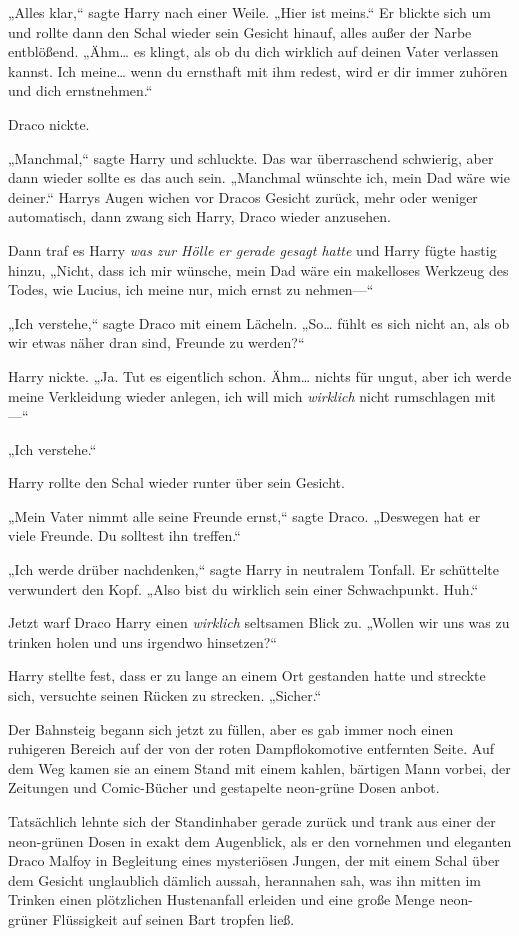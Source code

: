 {„Alles klar,“ sagte Harry nach einer Weile. „Hier ist meins.“ Er blickte sich um und rollte dann den Schal wieder sein Gesicht hinauf, alles außer der Narbe entblößend. „Ähm… es klingt, als ob du dich wirklich auf deinen Vater verlassen kannst. Ich meine… wenn du ernsthaft mit ihm redest, wird er dir immer zuhören und dich ernstnehmen.“

Draco nickte.

„Manchmal,“ sagte Harry und schluckte. Das war überraschend schwierig, aber dann wieder sollte es das auch sein. „Manchmal wünschte ich, mein Dad wäre wie deiner.“ Harrys Augen wichen vor Dracos Gesicht zurück, mehr oder weniger automatisch, dann zwang sich Harry, Draco wieder anzusehen.

Dann traf es Harry \emph{was zur Hölle er gerade gesagt hatte} und Harry fügte hastig hinzu, „Nicht, dass ich mir wünsche, mein Dad wäre ein makelloses Werkzeug des Todes, wie Lucius, ich meine nur, mich ernst zu nehmen—“

„Ich verstehe,“ sagte Draco mit einem Lächeln. „So… fühlt es sich nicht an, als ob wir etwas näher dran sind, Freunde zu werden?“

Harry nickte. „Ja. Tut es eigentlich schon. Ähm… nichts für ungut, aber ich werde meine Verkleidung wieder anlegen, ich will mich \emph{wirklich} nicht rumschlagen mit—“

„Ich verstehe.“

Harry rollte den Schal wieder runter über sein Gesicht.

„Mein Vater nimmt alle seine Freunde ernst,“ sagte Draco. „Deswegen hat er viele Freunde. Du solltest ihn treffen.“

„Ich werde drüber nachdenken,“ sagte Harry in neutralem Tonfall. Er schüttelte verwundert den Kopf. „Also bist du wirklich sein einer Schwachpunkt. Huh.“

Jetzt warf Draco Harry einen \emph{wirklich} seltsamen Blick zu. „Wollen wir uns was zu trinken holen und uns irgendwo hinsetzen?“

Harry stellte fest, dass er zu lange an einem Ort gestanden hatte und streckte sich, versuchte seinen Rücken zu strecken. „Sicher.“

Der Bahnsteig begann sich jetzt zu füllen, aber es gab immer noch einen ruhigeren Bereich auf der von der roten Dampflokomotive entfernten Seite. Auf dem Weg kamen sie an einem Stand mit einem kahlen, bärtigen Mann vorbei, der Zeitungen und Comic-Bücher und gestapelte neon-grüne Dosen anbot.

Tatsächlich lehnte sich der Standinhaber gerade zurück und trank aus einer der neon-grünen Dosen in exakt dem Augenblick, als er den vornehmen und eleganten Draco Malfoy in Begleitung eines mysteriösen Jungen, der mit einem Schal über dem Gesicht unglaublich dämlich aussah, herannahen sah, was ihn mitten im Trinken einen plötzlichen Hustenanfall erleiden und eine große Menge neon-grüner Flüssigkeit auf seinen Bart tropfen ließ.

}
